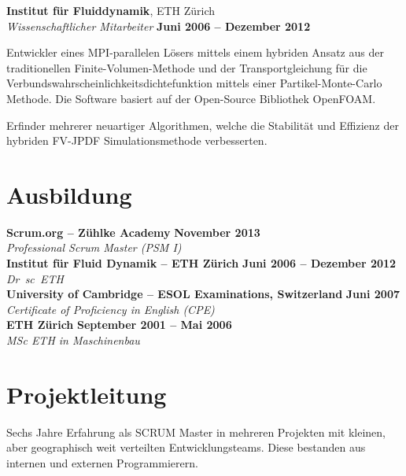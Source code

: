 \documentclass[line,11pt,a4paper]{../resume}
\begin{document}
\begin{resume}
\textbf{Institut für Fluiddynamik}, ETH Zürich\\\vspace{1mm}%
\textsl{Wissenschaftlicher Mitarbeiter} \hfill \textbf{Juni 2006 -- Dezember 2012}\\
\vspace{-4mm}%
\begin{list2}
  \item Entwickler eines MPI-parallelen Lösers mittels einem hybriden Ansatz aus
    der traditionellen Finite-Volumen-Methode und der Transportgleichung für
    die Verbundswahrscheinlichkeitsdichtefunktion mittels einer
    Partikel-Monte-Carlo Methode. Die Software basiert auf der Open-Source
    Bibliothek OpenFOAM.

  \item Erfinder mehrerer neuartiger Algorithmen, welche die Stabilität und
    Effizienz der hybriden FV-JPDF Simulationsmethode verbesserten.
\end{list2}

\pagebreak
\section{\mysidestyle Ausbildung}\vspace{2mm}

\textbf{Scrum.org -- Zühlke Academy} \hfill \textbf{November 2013}\\
\vspace{1mm}%
\textsl{Professional Scrum Master (PSM I)}\\
\vspace{-1mm}%
%
\textbf{Institut für Fluid Dynamik -- ETH Zürich} \hfill \textbf{Juni 2006 -- Dezember 2012}\\
\vspace{1mm}%
\textsl{Dr\ sc\ ETH}\\
\vspace{-1mm}%
%
\textbf{University of Cambridge -- ESOL Examinations, Switzerland} \hfill \textbf{Juni 2007}\\
\vspace{1mm}%
\textsl{Certificate of Proficiency in English (CPE)}\\
\vspace{-1mm}%
%
\textbf{ETH Zürich} \hfill \textbf{September 2001 -- Mai 2006}\\
\vspace{1mm}%
\textsl{MSc ETH in Maschinenbau}

\section{\mysidestyle Projektleitung}\vspace{6mm}
\begin{list2}
  \item Sechs Jahre Erfahrung als SCRUM Master in mehreren Projekten mit
    kleinen, aber geographisch weit verteilten Entwicklungsteams. Diese
    bestanden aus internen und externen Programmierern.


\end{list2}
\end{resume}
\end{document}
